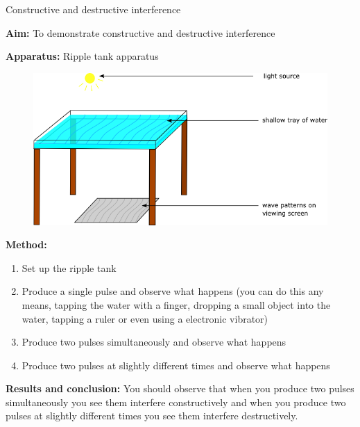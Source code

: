 	

\begin{g_experiment}{Constructive and destructive interference}

\textbf{Aim:} To demonstrate constructive and destructive interference
\par 
\label{m38802*eip7241}\noindent{}\textbf{Apparatus: } 
Ripple tank apparatus
    \setcounter{subfigure}{0}
	\begin{figure}[H] %
    \begin{center}
    \label{m38802*id63458!!!underscore!!!media}\label{m38802*id63458!!!underscore!!!printimage}\includegraphics[width=0.8\columnwidth]{col11305.imgs/m38802_rippletray.png} %
    \end{center}
 \end{figure}       \par 
\label{m38802*eip7474}\noindent{}\textbf{Method:}
\label{m38802*id6242}\begin{enumerate}[noitemsep, label=\textbf{\arabic*}. ] 
            \item Set up the ripple tank	
	    \item Produce a single pulse and observe what happens (you can do this any means, tapping the water with a finger, dropping a small object into the water, tapping a ruler or even using a electronic vibrator)
	  \item Produce two pulses simultaneously and observe what happens
	  \item Produce two pulses at slightly different times and observe what happens\end{enumerate}
\par 
\label{m38802*id614134}\noindent{}\textbf{Results and conclusion:} You should observe that when you produce two pulses simultaneously you see them interfere constructively and when you produce two pulses at slightly different times you see them interfere destructively.
\par \label{m38802*secfhsst!!!underscore!!!id636}
\end{g_experiment}


